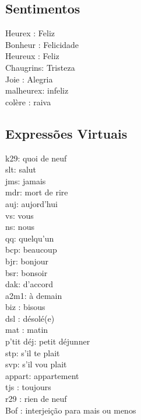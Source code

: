 \documentclass{article}
\begin{document}
    \subsection{Sentimentos}
        Heurex   : Feliz\\
        Bonheur  : Felicidade\\
        Heureux  : Feliz\\
        Chaugrins: Tristeza\\
        Joie     : Alegria\\
        malheurex: infeliz\\
        colère   : raiva\\

    \subsection{Expressões Virtuais}
        k29: quoi de neuf\\
        slt: salut\\
        jms: jamais\\
        mdr: mort de rire\\
        auj: aujord'hui\\
        vs: vous\\
        ns: nous\\
        qq: quelqu'un\\
        bcp: beaucoup\\
        bjr: bonjour\\
        bsr: bonsoir\\
        dak: d'accord\\
        a2m1: à demain\\
        biz : bisous\\
        dsl : désolé(e)\\
        mat : matin\\
        p'tit déj: petit déjunner\\
        stp: s'il te plait\\
        svp: s'il vou plait\\
        appart: appartement\\
        tjs   : toujours\\
        r29   : rien de neuf\\
        Bof   : interjeição para mais ou menos\\
        
\end{document}
